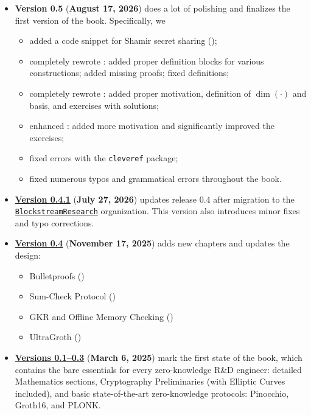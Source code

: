 \begin{itemize}
    \item \textbf{Version 0.5} (\textbf{August 17, 2026}) does a lot of polishing and finalizes the first version of the book.
    Specifically, we
    \begin{itemize}
        \item added a code snippet for Shamir secret sharing ();
        \item completely rewrote : added proper definition blocks for various constructions; added missing proofs; fixed definitions;
        \item completely rewrote : added proper motivation, definition of $\dim(\cdot)$ and basis, and exercises with solutions;
        \item enhanced : added more motivation and significantly improved the exercises;
        \item fixed errors with the \texttt{cleveref} package;
        \item fixed numerous typos and grammatical errors throughout the book.
    \end{itemize}
    \item \href{https://github.com/BlockstreamResearch/zk-book/releases/tag/v0.4.1}{\textbf{Version 0.4.1}} (\textbf{July 27, 2026}) updates release 0.4 after migration to the \href{https://github.com/BlockstreamResearch}{\texttt{BlockstreamResearch}} organization.
    This version also introduces minor fixes and typo corrections.
    \item \href{https://github.com/BlockstreamResearch/zk-book/releases/tag/v0.4}{\textbf{Version 0.4}} (\textbf{November 17, 2025}) adds new chapters and updates the design:
    \begin{itemize}
        \item Bulletproofs ()
        \item Sum-Check Protocol ()
        \item GKR and Offline Memory Checking ()
        \item UltraGroth ()
    \end{itemize}
    \item \href{https://github.com/BlockstreamResearch/zk-book/releases/tag/v0.3}{\textbf{Versions 0.1--0.3}} (\textbf{March 6, 2025}) mark the first state of the book, which contains the bare essentials for every zero-knowledge R\&D engineer: detailed Mathematics sections, Cryptography Preliminaries (with Elliptic Curves included), and basic state-of-the-art zero-knowledge protocols: Pinocchio, Groth16, and PLONK.
\end{itemize}